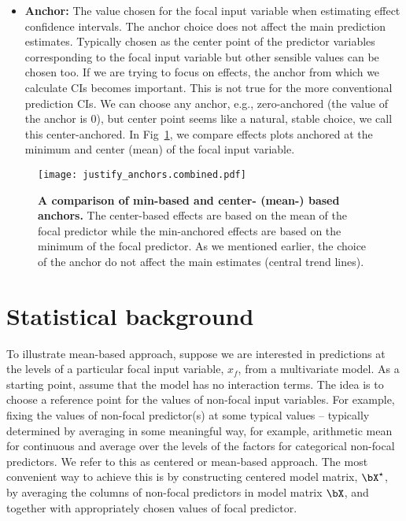 \begin{itemize}
\item \textbf{Anchor:} The value chosen for the focal input variable when estimating effect confidence intervals. The anchor choice does not affect the main prediction estimates. Typically chosen as the center point of the predictor variables corresponding to the focal input variable but other sensible values can be chosen too. If we are trying to focus on effects, the anchor from which we calculate CIs becomes important. This is not true for the more conventional prediction CIs. We can choose any anchor, e.g., zero-anchored (the value of the anchor is $0$), but center point seems like a natural, stable choice, we call this center-anchored. In Fig~\ref{fig:justify_anchors}, we compare effects plots anchored at the minimum and center (mean) of the focal input variable.
\end{itemize}


\begin{figure}
\begin{center}
\texttt{[image: justify\_anchors.combined.pdf]}
\end{center}
\caption{{\bf A comparison of min-based and center- (mean-) based anchors.} The center-based effects are based on the mean of the focal predictor while the min-anchored effects are based on the minimum of the focal predictor. As we mentioned earlier, the choice of the anchor do not affect the main estimates (central trend lines).} 
\label{fig:justify_anchors}
\end{figure}







\section{Statistical background}

To illustrate mean-based approach, suppose we are interested in predictions at the levels of a particular focal input variable, $x_f$, from a multivariate model. As a starting point, assume that the model has no interaction terms. The idea is to choose a reference point for the values of non-focal input variables. For example, fixing the values of non-focal predictor(s) at some typical values -- typically determined by averaging in some meaningful way, for example, arithmetic mean  for continuous and average over the levels of the factors for categorical non-focal predictors. We refer to this as centered or mean-based approach. The most convenient way to achieve this is by constructing centered model matrix, $\bX^\star$, by averaging the columns of non-focal predictors in model matrix $\bX$, and together with appropriately chosen values of focal predictor.


